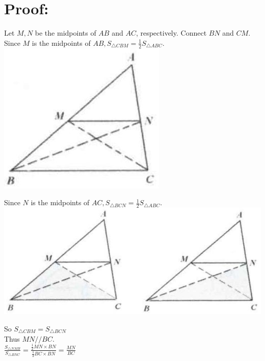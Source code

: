 \documentclass[10pt]{article}
\begin{document}
\section*{Proof:}
Let \(M, N\) be the midpoints of \(A B\) and \(A C\), respectively. Connect \(B N\) and \(C M\).\\
Since \(M\) is the midpoints of \(A B, S_{\triangle C B M}=\frac{1}{2} S_{\triangle A B C}\).\\
\includegraphics[max width=\textwidth, center]{2025_04_17_97bc1f7e44d93c271a88g-032}

Since \(N\) is the midpoints of \(A C, S_{\triangle B C N}=\frac{1}{2} S_{\triangle A B C}\).\\
\includegraphics[max width=\textwidth, center]{2025_04_17_97bc1f7e44d93c271a88g-032(1)}

So \(S_{\triangle C B M}=S_{\triangle B C N}\)\\
Thus \(M N / / B C\).\\
\(\frac{S_{\triangle N M B}}{S_{\triangle B N C}}=\frac{\frac{1}{2} M N \times B N}{\frac{1}{2} B C \times B N}=\frac{M N}{B C}\)
\end{document}

